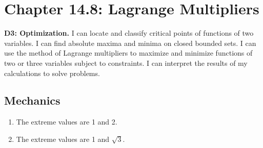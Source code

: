 
\fancyhead[R]{\daythirteen}

\section*{\centering Chapter 14.8: Lagrange Multipliers}

\textbf{D3: Optimization.} I can locate and classify critical points of functions of two variables. I can find absolute maxima and minima on closed bounded sets. I can use the method of Lagrange multipliers to maximize and minimize functions of two or three variables subject to constraints. I can interpret the results of my calculations to solve problems.

\subsection*{Mechanics}
\begin{enumerate}	
	\item {}
    {%
    The extreme values are 1 and 2.
    }
    {%
    } 
    \item {}
    {%
    The extreme values are 1 and $\sqrt{3}$.
    }
    {%
    } 

\end{enumerate}

